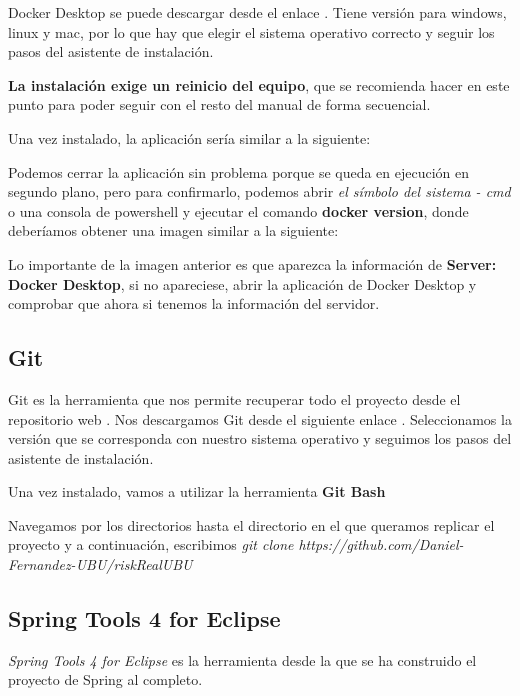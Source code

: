 Docker Desktop se puede descargar desde el enlace \cite{web:dockerDesktop}. Tiene versión para windows, linux y mac, por lo que hay que elegir el sistema operativo correcto y seguir los pasos del asistente de instalación.

\textbf{La instalación exige un reinicio del equipo}, que se recomienda hacer en este punto para poder seguir con el resto del manual de forma secuencial.

Una vez instalado, la aplicación sería similar a la siguiente:

Podemos cerrar la aplicación sin problema porque se queda en ejecución en segundo plano, pero para confirmarlo, podemos abrir \textit{el símbolo del sistema - cmd} o una consola de powershell y ejecutar el comando \textbf{docker version}, donde deberíamos obtener una imagen similar a la siguiente:

Lo importante de la imagen anterior es que aparezca la información de \textbf{Server: Docker Desktop}, si no apareciese, abrir la aplicación de Docker Desktop y comprobar que ahora si tenemos la información del servidor.

\subsection{Git}

Git es la herramienta que nos permite recuperar todo el proyecto desde el repositorio web \cite{github:proyect}. 
Nos descargamos Git desde el siguiente enlace \cite{web:git}.
Seleccionamos la versión que se corresponda con nuestro sistema operativo y seguimos los pasos del asistente de instalación.

Una vez instalado, vamos a utilizar la herramienta \textbf{Git Bash}

Navegamos por los directorios hasta el directorio en el que queramos replicar el proyecto y a continuación, escribimos \textit{git clone https://github.com/Daniel-Fernandez-UBU/riskRealUBU}

\subsection{Spring Tools 4 for Eclipse}

\textit{Spring Tools 4 for Eclipse} es la herramienta desde la que se ha construido el proyecto de Spring al completo. 

